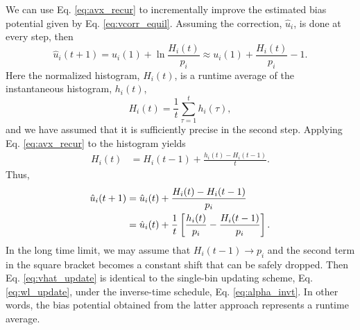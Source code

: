 \documentclass[reprint, superscriptaddress, floatfix]{revtex4-1}
\begin{document}
We can use Eq. \eqref{eq:avx_recur} to incrementally
improve the estimated
bias potential given by Eq. \eqref{eq:vcorr_equil}.
%
Assuming the correction, $\hat u_i$, is done at every step,
then
%
\begin{equation*}
  \hat u_i(t+1) = u_i(1) +
  \ln \frac{ H_i(t) } { p_i }
  \approx
  u_i(1) +
  \frac{ H_i(t) } { p_i } - 1
  .
\end{equation*}
%
Here the normalized histogram, $H_i(t)$,
is a runtime average of the instantaneous histogram, $h_i(t)$,
%
\begin{equation}
  H_i(t) = \frac 1 t \sum_{\tau = 1}^t h_i(\tau),
  \label{eq:hav_def}
\end{equation}
%
and we have assumed that it
is sufficiently precise in the second step.
%
Applying Eq. \eqref{eq:avx_recur} to the histogram yields
%
\begin{align}
  H_i(t)
  &=
  H_i(t-1) + \frac{ h_i(t) - H_i(t-1) } { t }
  .
  \label{eq:avH_recur}
\end{align}
%
Thus,
%
\begin{align}
  \hat u_i(t+1)
  &=
  \hat u_i(t)
  +
  \frac{ H_i(t) - H_i(t-1) }{ p_i }
  \notag
  \\
  &=
  \hat u_i(t)
  +
  \frac{1}{t} \left[
    \frac{ h_i(t) }{ p_i }
   -\frac{ H_i(t-1) }{ p_i }
  \right]
  .
  \label{eq:vhat_update}
\end{align}
%
In the long time limit, we may assume that $H_i(t-1) \to p_i$
and the second term in the square bracket
becomes a constant shift that can be safely dropped.
%
Then Eq. \eqref{eq:vhat_update} is identical to
the single-bin updating scheme, Eq. \eqref{eq:wl_update},
under the inverse-time schedule, Eq. \eqref{eq:alpha_invt}.
%
In other words, the bias potential obtained from the latter approach
represents a runtime average.
\end{document}
